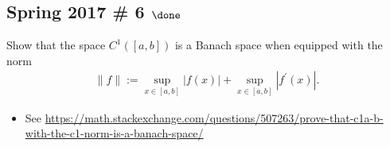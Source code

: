 \hypertarget{spring-2017-6-done}{%
\subsection{\texorpdfstring{Spring 2017 \# 6
\(\done\)}{Spring 2017 \# 6 \textbackslash done}}\label{spring-2017-6-done}}

Show that the space \(C^1([a, b])\) is a Banach space when equipped with
the norm
\begin{align*}
\|f\|:=\sup _{x \in[a, b]}|f(x)|+\sup _{x \in[a, b]}\left|f^{\prime}(x)\right|.
\end{align*}


\begin{concept}

\hfill

\begin{itemize}
\tightlist
\item
  See
  \url{https://math.stackexchange.com/questions/507263/prove-that-c1a-b-with-the-c1-norm-is-a-banach-space/}
\end{itemize}

\end{concept}

